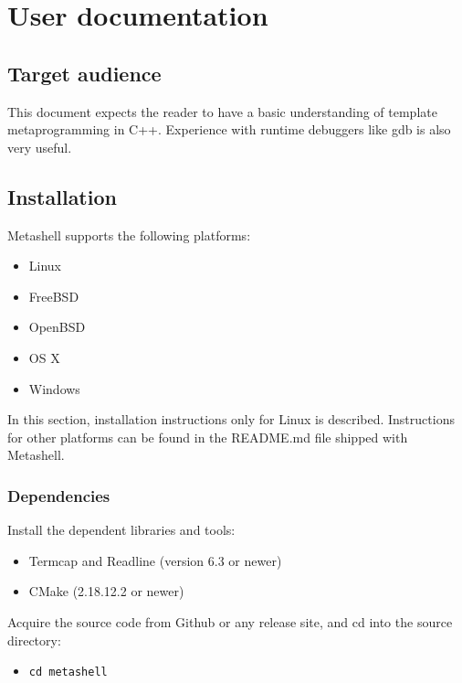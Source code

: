 
\chapter{User documentation}

\section{Target audience}

This document expects the reader to have a basic understanding of template
metaprogramming in
C++\cite{using-cpp-metaprograms,generative-programming,functional-programming-cefp}.
Experience with runtime debuggers like gdb\cite{gdb} is also very useful.

\section{Installation}

Metashell supports the following platforms:
\begin{itemize}
    \item Linux
    \item FreeBSD
    \item OpenBSD
    \item OS X
    \item Windows
\end{itemize}

In this section, installation instructions only for Linux is described.
Instructions for other platforms can be found in the README.md file shipped
with Metashell.

\subsection{Dependencies}

Install the dependent libraries and tools:

\begin{itemize}
    \item Termcap and Readline\cite{readline} (version 6.3 or newer)
    \item CMake\cite{cmake} (2.18.12.2 or newer)
\end{itemize}

Acquire the source code from Github\cite{github} or any release site, and cd
into the source directory:

\begin{itemize}
    \item \texttt{cd metashell}
\end{itemize}

